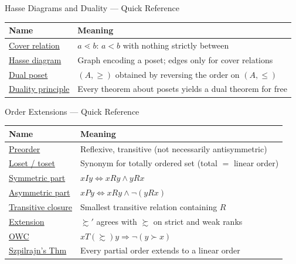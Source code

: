 \begin{toolkitbox}{Hasse Diagrams and Duality --- Quick Reference}
\small
\begin{tabular}{l l}
\toprule
\textbf{Name}  & \textbf{Meaning} \\
\midrule
\hyperref[def:cover-relation]{Cover relation}     & $a \lessdot b$: $a < b$ with nothing strictly between       \\
\hyperref[def:hasse]{Hasse diagram}      & Graph encoding a poset; edges only for cover relations      \\
\hyperref[def:dual-poset]{Dual poset}         & $(A, \geq)$ obtained by reversing the order on $(A, \leq)$  \\
\hyperref[prop:order-duality]{Duality principle}  & Every theorem about posets yields a dual theorem for free   \\
\bottomrule
\end{tabular}
\end{toolkitbox}



\begin{toolkitbox}{Order Extensions --- Quick Reference}
\small
\begin{tabular}{l l}
\toprule
\textbf{Name}  & \textbf{Meaning} \\
\midrule
\hyperref[def:preorder]{Preorder}             & Reflexive, transitive (not necessarily antisymmetric)         \\
\hyperref[def:totally-ordered-set]{Loset / toset}      & Synonym for totally ordered set (total $=$ linear order)     \\
\hyperref[def:sym-asym]{Symmetric part}       & $xIy \iff xRy \land yRx$                                     \\
\hyperref[def:sym-asym]{Asymmetric part}      & $xPy \iff xRy \land \lnot(yRx)$                              \\
\hyperref[def:relation-transitive-closure]{Transitive closure}   & Smallest transitive relation containing $R$                  \\
\hyperref[def:preorder-extension]{Extension}            & $\succsim'$ agrees with $\succsim$ on strict and weak ranks  \\
\hyperref[def:owc]{OWC}                  & $xT(\succsim)y \Rightarrow \lnot(y \succ x)$                 \\
\hyperref[thm:szpilrajn]{Szpilrajn's Thm}      & Every partial order extends to a linear order                \\
\bottomrule
\end{tabular}
\end{toolkitbox}

